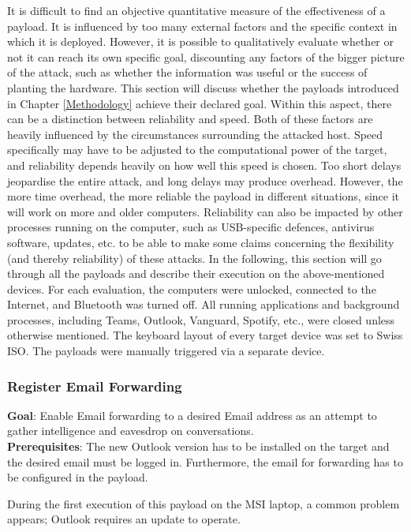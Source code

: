 It is difficult to find an objective quantitative measure of the effectiveness of a payload. It is influenced by too many external factors and the specific context in which it is deployed. However, it is possible to qualitatively evaluate whether or not it can reach its own specific goal, discounting any factors of the bigger picture of the attack, such as whether the information was useful or the success of planting the hardware. This section will discuss whether the payloads introduced in Chapter \ref{Methodology} achieve their declared goal. Within this aspect, there can be a distinction between reliability and speed. Both of these factors are heavily influenced by the circumstances surrounding the attacked host. Speed specifically may have to be adjusted to the computational power of the target, and reliability depends heavily on how well this speed is chosen. Too short delays jeopardise the entire attack, and long delays may produce overhead. However, the more time overhead, the more reliable the payload in different situations, since it will work on more and older computers. Reliability can also be impacted by other processes running on the computer, such as USB-specific defences, antivirus software, updates, etc. to be able to make some claims concerning the flexibility (and thereby reliability) of these attacks. 
In the following, this section will go through all the payloads and describe their execution on the above-mentioned devices. For each evaluation, the computers were unlocked, connected to the Internet, and Bluetooth was turned off. All running applications and background processes, including Teams, Outlook, Vanguard, Spotify, etc., were closed unless otherwise mentioned. The keyboard layout of every target device was set to Swiss ISO. The payloads were manually triggered via a separate device. 

\subsubsection{Register Email Forwarding}

\textbf{Goal}: Enable Email forwarding to a desired Email address as an attempt to gather intelligence and eavesdrop on conversations. \\
\textbf{Prerequisites}: The new Outlook version has to be installed on the target and the desired email must be logged in. Furthermore, the email for forwarding has to be configured in the payload. 

During the first execution of this payload on the MSI laptop, a common problem appears; Outlook requires an update to operate. 

